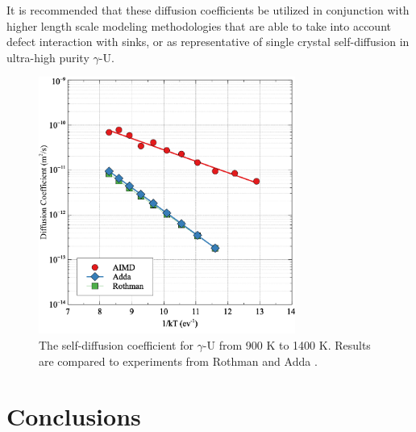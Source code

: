 \documentclass[review]{elsarticle}
\begin{document}
It is recommended that these diffusion coefficients be utilized in conjunction with higher length scale modeling methodologies that are able to take into account defect interaction with sinks, or as representative of single crystal self-diffusion in ultra-high purity $\gamma$-U.

 \begin{figure}[h]
 \centering
 \includegraphics[width=0.75\textwidth]{9_self_diff.png} 
 \caption{The self-diffusion coefficient for $\gamma$-U from 900 K to 1400 K. Results are compared to experiments from Rothman \cite{rothman1959} and Adda \cite{adda1959}. }
 \label{fig:selfdiff}
\end{figure}

\FloatBarrier

\section{Conclusions}
\end{document}
